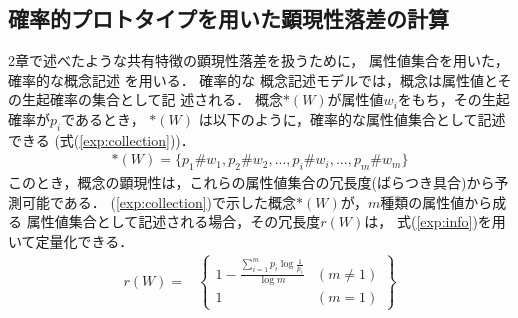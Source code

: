 \subsection{確率的プロトタイプを用いた顕現性落差の計算}
2章で述べたような共有特徴の顕現性落差を扱うために，
属性値集合を用いた，確率的な概念記述
を用いる．
確率的な
概念記述モデルでは，概念は属性値とその生起確率の集合として記
述される\cite{Iwayama1990,Masui1999}．
概念$\ast(W)$が属性値$w_i$をもち，その生起確率が$p_i$であるとき，
$\ast(W)$ は以下のように，確率的な属性値集合として記述できる
(式(\ref{exp:collection}))．
\begin{eqnarray}
\label{exp:collection}
	{\ast}(W) = \{p_1\#w_1,p_2\#w_2,...,p_i\#w_i,...,p_m\#w_m\}
\end{eqnarray}
このとき，概念の顕現性は，これらの属性値集合の冗長度(ばらつき具合)から予
測可能である．
(\ref{exp:collection})で示した概念${\ast}(W)$が，$m$種類の属性値から成る
属性値集合として記述される場合，その冗長度$r(W)$は，
式(\ref{exp:info})を用いて定量化できる\cite{Iwayama1991j}．
\begin{eqnarray}
\label{exp:info}
r(W) = &
	\left\{\begin{array}{cc}
	 1 - \frac{\sum_{i=1}^{m}{p_i}\log{\frac{1}{p_i}}}{\log{m}} & (m{\neq}1)\\
	{1} & (m=1)
		\end{array}\right \}
\end{eqnarray}

